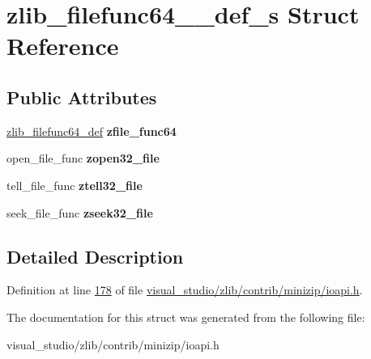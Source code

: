 \hypertarget{structzlib__filefunc64__32__def__s}{}\section{zlib\+\_\+filefunc64\+\_\+\_\+def\+\_\+s Struct Reference}
\label{structzlib__filefunc64__32__def__s}
\subsection*{Public Attributes}
\begin{DoxyCompactItemize}
\item 
\mbox{\label{structzlib__filefunc64__32__def__s_a5b05687723a1a8cd310a73ab62fc31f5}} 
\hyperlink{structzlib__filefunc64__def__s}{zlib\+\_\+filefunc64\+\_\+def} {\bfseries zfile\+\_\+func64}
\item 
\mbox{\label{structzlib__filefunc64__32__def__s_a784a1cead2df16b1ce5881f32236308a}} 
open\+\_\+file\+\_\+func {\bfseries zopen32\+\_\+file}
\item 
\mbox{\label{structzlib__filefunc64__32__def__s_a8ef46da9e69697b4f13cd611523761a8}} 
tell\+\_\+file\+\_\+func {\bfseries ztell32\+\_\+file}
\item 
\mbox{\label{structzlib__filefunc64__32__def__s_a2c6e18405ec9c8b2d482055e9bf06766}} 
seek\+\_\+file\+\_\+func {\bfseries zseek32\+\_\+file}
\end{DoxyCompactItemize}


\subsection{Detailed Description}


Definition at line \hyperlink{visual__studio_2zlib_2contrib_2minizip_2ioapi_8h_source_l00178}{178} of file \hyperlink{visual__studio_2zlib_2contrib_2minizip_2ioapi_8h_source}{visual\+\_\+studio/zlib/contrib/minizip/ioapi.\+h}.



The documentation for this struct was generated from the following file\+:\begin{DoxyCompactItemize}
\item 
visual\+\_\+studio/zlib/contrib/minizip/ioapi.\+h\end{DoxyCompactItemize}
